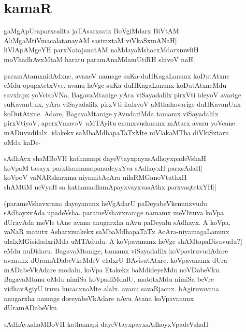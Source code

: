 \chapter{kamaR}\label{chap5}

\begin{shloka}
gaMgApUraparxcalita jaTAsarxsatx BoVgiMdarx BiVtAM\\
AliMgaMtiVmacalatanayAM sasimxtaM viVkaSxmANaH|\\
liVlApAMgeYH parxNatajanatAM naMdayaMshacxMdarxmwliH\\
moVhadhAvxMtaM haratu paramAnaMdamUtiRH shivoV naH||
\end{shloka}

paramAtamxnidAdxne, avaneV namage suKa-duHKagaLanunx koDutAtxne eMdu opupxtetxVve. avanu heVge suKa duHKagaLanunx koDutAtxneMdu savxlapx yoVcisoVNa. BagavaMtanige yAra viSayadalilx pirxVti ideyoV avarige suKavanUnx, yAra viSayadalilx pirxVti ilalxvoV aMthahavarige duHKavanUnx koDutAtxne. Adare, BagavaMtanige yAvudariMda tamamx viSayadalilx pirxVtiyoV, aperxVmavoV uMTAyitu enunxvudanunx mAtarx avaru yoVcane mADuvudilalx. idakekx saMbaMdhapaTaTxMte niVlakaMTha diVkiSxtaru oMdu kaDe-

\begin{shloka}
sAdhAyx shaMBoVH kathamapi dayeVtayxpayxsAdhoyxpadeVshaH\\
koVpaM tasayx parxthamamapanudeyxYva sAdhayxH parxsAdaH|\\
koVpoV vaNARsharxma niyamitAcAra nilaRMGanoVtathxH\\
shAMtiM neVyaH sa kathamadhunApayxvayxvasAthx parxvaqtetxYH||
\end{shloka}

(parameVshavxrana dayeyanunx heVgAdarU paDeyabeVkenunxvudu sAdhayxvAda upadeVsha. parameVshavxranige namamx meVliruva koVpa dUravAda meVle tAne avana anugarxha nAvu paDeyalu sAdhayx. A koVpa, vaNaR matutx Asharxmakekx saMbaMdhapaTaTx AcAra-niyamagaLanunx ulalxMGisidadxriMda uMTAdudu. A koVpavanunx heVge shAMtapaDisuvudu?) eMdu nuDidaru. BagavaMtanige, tamamx viSayadalilx koVpaviruvudAdare avanunx dUramADabeVkeMdeV elalxrU BAvisutAtxre. koVpavanunx dUra mADabeVkAdare modalu, koVpa Etakekx baMdideyeMdu noVDabeVku. BagavaMtanu oMdu nimiSa koVpadiMdalU, matotxMdu nimiSa beVre vidhavAgiyU iruva hucacxnaMte alalx. avanu savaRjacnx. hAgiruvavana anugarxha namage doreyabeVkAdare nAvu Atana koVpavanunx dUramADabeVku.

\begin{shloka}
sAdhAyxshaMBoVH kathamapi dayeVtayxpayxsAdhoyxVpadeVshaH
\end{shloka}

